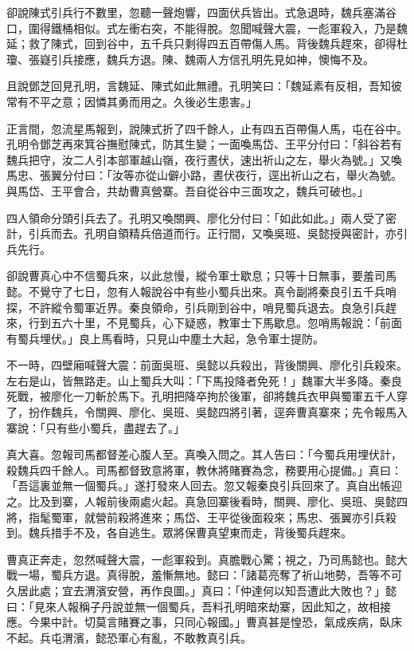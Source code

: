 卻說陳式引兵行不數里，忽聽一聲炮響，四面伏兵皆出。式急退時，魏兵塞滿谷口，圍得鐵桶相似。式左衝右突，不能得脫。忽聞喊聲大震，一彪軍殺入，乃是魏延；救了陳式，回到谷中，五千兵只剩得四五百帶傷人馬。背後魏兵趕來，卻得杜瓊、張嶷引兵接應，魏兵方退。陳、魏兩人方信孔明先見如神，懊悔不及。

且說鄧芝回見孔明，言魏延、陳式如此無禮。孔明笑曰：「魏延素有反相，吾知彼常有不平之意；因憐其勇而用之。久後必生患害。」

正言間，忽流星馬報到，說陳式折了四千餘人，止有四五百帶傷人馬，屯在谷中。孔明令鄧芝再來箕谷撫慰陳式，防其生變；一面喚馬岱、王平分付曰：「斜谷若有魏兵把守，汝二人引本部軍越山嶺，夜行晝伏，速出祈山之左，舉火為號。」又喚馬忠、張翼分付曰：「汝等亦從山僻小路，晝伏夜行，逕出祈山之右，舉火為號。與馬岱、王平會合，共劫曹真營寨。吾自從谷中三面攻之，魏兵可破也。」

四人領命分頭引兵去了。孔明又喚關興、廖化分付曰：「如此如此。」兩人受了密計，引兵而去。孔明自領精兵倍道而行。正行間，又喚吳班、吳懿授與密計，亦引兵先行。

卻說曹真心中不信蜀兵來，以此怠慢，縱令軍士歇息；只等十日無事，要羞司馬懿。不覺守了七日，忽有人報說谷中有些小蜀兵出來。真令副將秦良引五千兵哨探，不許縱令蜀軍近界。秦良領命，引兵剛到谷中，哨見蜀兵退去。良急引兵趕來，行到五六十里，不見蜀兵，心下疑惑，教軍士下馬歇息。忽哨馬報說：「前面有蜀兵埋伏。」良上馬看時，只見山中塵土大起，急令軍士提防。

不一時，四壁廂喊聲大震：前面吳班、吳懿以兵殺出，背後關興、廖化引兵殺來。左右是山，皆無路走。山上蜀兵大叫：「下馬投降者免死！」魏軍大半多降。秦良死戰，被廖化一刀斬於馬下。孔明把降卒拘於後軍，卻將魏兵衣甲與蜀軍五千人穿了，扮作魏兵，令關興、廖化、吳班、吳懿四將引著，逕奔曹真寨來；先令報馬入寨說：「只有些小蜀兵，盡趕去了。」

真大喜。忽報司馬都督差心腹人至。真喚入問之。其人告曰：「今蜀兵用埋伏計，殺魏兵四千餘人。司馬都督致意將軍，教休將賭賽為念，務要用心提備。」真曰：「吾這裏並無一個蜀兵。」遂打發來人回去。忽又報秦良引兵回來了。真自出帳迎之。比及到寨，人報前後兩處火起。真急回寨後看時，關興、廖化、吳班、吳懿四將，指髦蜀軍，就營前殺將進來；馬岱、王平從後面殺來；馬忠、張翼亦引兵殺到。魏兵措手不及，各自逃生。眾將保曹真望東而走，背後蜀兵趕來。

曹真正奔走，忽然喊聲大震，一彪軍殺到。真膽戰心驚；視之，乃司馬懿也。懿大戰一場，蜀兵方退。真得脫，羞慚無地。懿曰：「諸葛亮奪了祈山地勢，吾等不可久居此處；宜去渭濱安營，再作良圖。」真曰：「仲達何以知吾遭此大敗也？」懿曰：「見來人報稱子丹說並無一個蜀兵，吾料孔明暗來劫寨，因此知之，故相接應。今果中計。切莫言賭賽之事，只同心報國。」曹真甚是惶恐，氣成疾病，臥床不起。兵屯渭濱，懿恐軍心有亂，不敢教真引兵。

